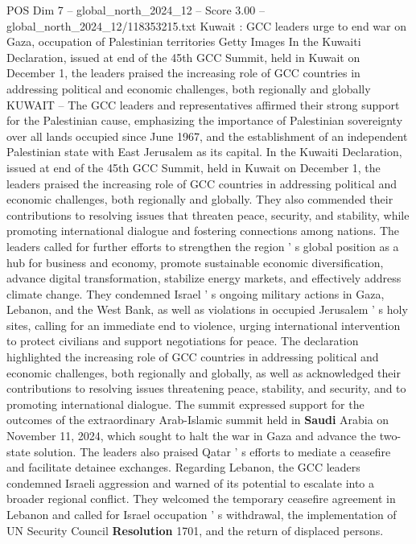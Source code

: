 \begin{textsample}{POS Dim 7 – global\_north\_2024\_12 – Score 3.00 – global\_north\_2024\_12/118353215.txt}  \label{ex:f7_pos_291}
Kuwait : GCC leaders urge to end war on Gaza, occupation of Palestinian territories Getty Images In the Kuwaiti Declaration, issued at end of the 45th GCC Summit, held in Kuwait on December 1, the leaders praised the increasing role of GCC countries in addressing political and economic challenges, both regionally and globally KUWAIT -- The GCC leaders and representatives affirmed their strong support for the Palestinian cause, emphasizing the importance of Palestinian sovereignty over all lands occupied since June 1967, and the establishment of an independent Palestinian state with East Jerusalem as its capital.
In the Kuwaiti Declaration, issued at end of the 45th GCC Summit, held in Kuwait on December 1, the leaders praised the increasing role of GCC countries in addressing political and economic challenges, both regionally and globally.
They also commended their contributions to resolving issues that threaten peace, security, and stability, while promoting international dialogue and fostering connections among nations.
The leaders called for further efforts to strengthen the region ' s global position as a hub for business and economy, promote sustainable economic diversification, advance digital transformation, stabilize energy markets, and effectively address climate change.
They condemned Israel ' s ongoing military actions in Gaza, Lebanon, and the West Bank, as well as violations in occupied Jerusalem ' s holy sites, calling for an immediate end to violence, urging international intervention to protect civilians and support negotiations for peace.
The declaration highlighted the increasing role of GCC countries in addressing political and economic challenges, both regionally and globally, as well as acknowledged their contributions to resolving issues threatening peace, stability, and security, and to promoting international dialogue.
The summit expressed support for the outcomes of the extraordinary Arab-Islamic summit held in \textbf{Saudi} Arabia on November 11, 2024, which sought to halt the war in Gaza and advance the two-state solution.
The leaders also praised Qatar ' s efforts to mediate a ceasefire and facilitate detainee exchanges.
Regarding Lebanon, the GCC leaders condemned Israeli aggression and warned of its potential to escalate into a broader regional conflict.
They welcomed the temporary ceasefire agreement in Lebanon and called for Israel occupation ' s withdrawal, the implementation of UN Security Council \textbf{Resolution} 1701, and the return of displaced persons.

\end{textsample}

